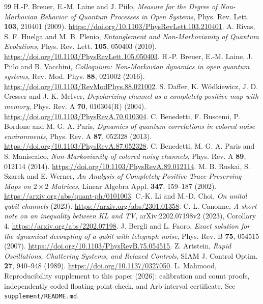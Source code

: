\documentclass[11pt]{article}
\begin{document}
\aistatement
\begin{thebibliography}{99}
 H.-P. Breuer, E.-M. Laine and J. Piilo,
\emph{Measure for the Degree of Non-Markovian Behavior of Quantum Processes
in Open Systems}, Phys. Rev. Lett. \textbf{103}, 210401 (2009).
\url{https://doi.org/10.1103/PhysRevLett.103.210401}.
 A. Rivas, S. F. Huelga and M. B. Plenio,
\emph{Entanglement and Non-Markovianity of Quantum Evolutions},
Phys. Rev. Lett. \textbf{105}, 050403 (2010).
\url{https://doi.org/10.1103/PhysRevLett.105.050403}.
 H.-P. Breuer, E.-M. Laine, J. Piilo and B. Vacchini,
\emph{Colloquium: Non-Markovian dynamics in open quantum systems},
Rev. Mod. Phys. \textbf{88}, 021002 (2016).
\url{https://doi.org/10.1103/RevModPhys.88.021002}.
 S. Daffer, K. W\'odkiewicz, J. D. Cresser and J. K. McIver,
\emph{Depolarizing channel as a completely positive map with memory},
Phys. Rev. A \textbf{70}, 010304(R) (2004).
\url{https://doi.org/10.1103/PhysRevA.70.010304}.
 C. Benedetti, F. Buscemi, P. Bordone and M. G. A. Paris,
\emph{Dynamics of quantum correlations in colored-noise environments},
Phys. Rev. A \textbf{87}, 052328 (2013).
\url{https://doi.org/10.1103/PhysRevA.87.052328}.
 C. Benedetti, M. G. A. Paris and S. Maniscalco,
\emph{Non-Markovianity of colored noisy channels},
Phys. Rev. A \textbf{89}, 012114 (2014).
\url{https://doi.org/10.1103/PhysRevA.89.012114}.
 M. B. Ruskai, S. Szarek and E. Werner,
\emph{An Analysis of Completely-Positive Trace-Preserving Maps on $2\times2$
Matrices}, Linear Algebra Appl. \textbf{347}, 159--187 (2002).
\url{https://arxiv.org/abs/quant-ph/0101003}.
 C.-K. Li and M.-D. Choi,
\emph{On unital qubit channels} (2023).
\url{https://arxiv.org/abs/2301.01358}.
 C. L. Canonne,
\emph{A short note on an inequality between KL and TV},
arXiv:2202.07198v2 (2023), Corollary 4.
\url{https://arxiv.org/abs/2202.07198}.
 J. Bergli and L. Faoro,
\emph{Exact solution for the dynamical decoupling of a qubit with telegraph noise},
Phys. Rev. B \textbf{75}, 054515 (2007).
\url{https://doi.org/10.1103/PhysRevB.75.054515}.
 Z. Artstein,
\emph{Rapid Oscillations, Chattering Systems, and Relaxed Controls},
SIAM J. Control Optim. \textbf{27}, 940--948 (1989).
\url{https://doi.org/10.1137/0327050}.
 L. Mahmood, Reproducibility supplement to this paper (2026):
calibration and count proofs, independently coded floating-point check,
and Arb interval certificate. See \texttt{supplement/README.md}.
\end{thebibliography}
\end{document}
